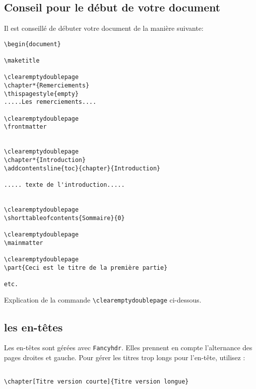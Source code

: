 \documentclass[10pt,a4paper]{article}
\begin{document}
\subsection{Conseil pour le début de votre document}
Il est conseillé de débuter votre document de la manière suivante:


\begin{Verbatim}[frame=single, framerule=0.2mm, rulecolor=\color{gray}, label=Début du document]
\begin{document}

\maketitle

\clearemptydoublepage
\chapter*{Remerciements}
\thispagestyle{empty}
.....Les remerciements....

\clearemptydoublepage
\frontmatter


\clearemptydoublepage
\chapter*{Introduction}
\addcontentsline{toc}{chapter}{Introduction}

..... texte de l'introduction.....


\clearemptydoublepage
\shorttableofcontents{Sommaire}{0}

\clearemptydoublepage
\mainmatter

\clearemptydoublepage
\part{Ceci est le titre de la première partie}

etc.
\end{Verbatim}

Explication de la commande \verb!\clearemptydoublepage! ci-dessous.

\subsection{les en-têtes}
Les en-têtes sont gérées avec \verb!Fancyhdr!. Elles prennent en compte l'alternance des pages droites et gauche.
Pour gérer les titres trop longs pour l'en-tête, utilisez :

\begin{Verbatim}[frame=single, framerule=0.2mm, rulecolor=\color{gray}, label=Longs titres de chapitre]

\chapter[Titre version courte]{Titre version longue}
\end{Verbatim}
\end{document}
